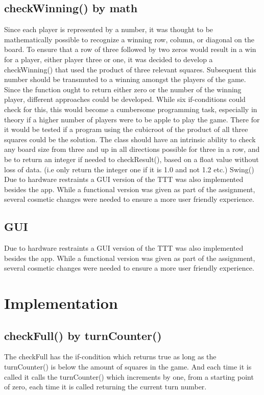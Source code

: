 \documentclass[a4paper,10pt]{article}
\begin{document}
\subsection{checkWinning() by math}
Since each player is represented by a number, it was thought to be mathematically possible to recognize a winning row, column, or diagonal on the board. To ensure that a row of three followed by two zeros would result in a win for a player, either player three or one, it was decided to develop a checkWinning() that used the product of three relevant squares.  Subsequent this number should be transmuted to a winning amongst the players of the game. Since the function ought to return either zero or the number of the winning player, different approaches could be developed.  While six if-conditions could check for this, this would become a cumbersome programming task, especially in theory if a higher number of players were to be apple to play the game.  There for it would be tested if a program using the cubicroot of the product of all three squares could be the solution. The class should have an intrinsic ability to check any board size from three and up in all directions possible for three in a row, and be to return an integer if needed to checkResult(), based on a float value without loss of data.  (i.e only return the integer one if it is 1.0 and not 1.2 etc.)
Swing()
Due to hardware restraints a GUI version of the TTT was also implemented besides the app. While a functional version was given as part of the assignment, several cosmetic changes were needed to ensure a more user friendly experience. 

\subsection{GUI}
Due to hardware restraints a GUI version of the TTT was also implemented besides the app. While a functional version was given as part of the assignment, several cosmetic changes were needed to ensure a more user friendly experience. 
	\section{Implementation}
	\subsection{checkFull() by turnCounter()}
	The checkFull has the if-condition which returns true as long as the turnCounter() is below the amount of squares in the game. And each time it is called it calls the turnCounter() which increments by one, from a starting point of zero, each time it is called returning the current turn number.
	
\end{document}
